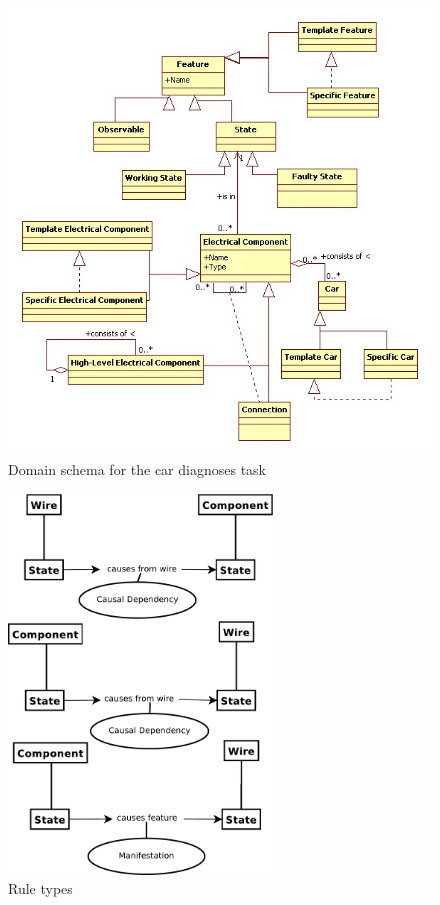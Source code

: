 \begin{figure}[htbp]
	\centering
		\includegraphics[width=1.00\textwidth]{DomainSchema.jpg}
	\caption{Domain schema for the car diagnoses task}
	\label{fig:DS}
\end{figure}

\begin{figure}[htbp]
	\centering
	\includegraphics[width=7cm]{rule-types.pdf}
	\caption{Rule types}
	\label{fig:IS}
\end{figure}

